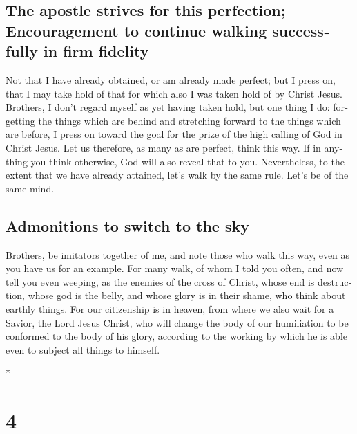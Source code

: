 \begin{paracol}{2}
\begin{otherlanguage}{english}
\hypertarget{the-apostle-strives-for-this-perfection-encouragement-to-continue-walking-successfully-in-firm-fidelity}{%
\subsection{The apostle strives for this perfection; Encouragement to
continue walking successfully in firm
fidelity}\label{the-apostle-strives-for-this-perfection-encouragement-to-continue-walking-successfully-in-firm-fidelity}}

 Not that I have already obtained, or am already made
perfect; but I press on, that I may take hold of that for which also I
was taken hold of by Christ Jesus.  Brothers, I don't
regard myself as yet having taken hold, but one thing I do: forgetting
the things which are behind and stretching forward to the things which
are before,  I press on toward the goal for the prize of
the high calling of God in Christ Jesus.  Let us
therefore, as many as are perfect, think this way. If in anything you
think otherwise, God will also reveal that to you. 
Nevertheless, to the extent that we have already attained, let's walk by
the same rule. Let's be of the same mind.

\hypertarget{admonitions-to-switch-to-the-sky}{%
\subsection{Admonitions to switch to the
sky}\label{admonitions-to-switch-to-the-sky}}

 Brothers, be imitators together of me, and note those
who walk this way, even as you have us for an example. 
For many walk, of whom I told you often, and now tell you even weeping,
as the enemies of the cross of Christ,  whose end is
destruction, whose god is the belly, and whose glory is in their shame,
who think about earthly things.  For our citizenship is
in heaven, from where we also wait for a Savior, the Lord Jesus Christ,
 who will change the body of our humiliation to be
conformed to the body of his glory, according to the working by which he
is able even to subject all things to himself.

\end{otherlanguage}

\switchcolumn[0]*

\hypertarget{section-6}{%
\section{4}\label{section-6}}


\end{paracol}
